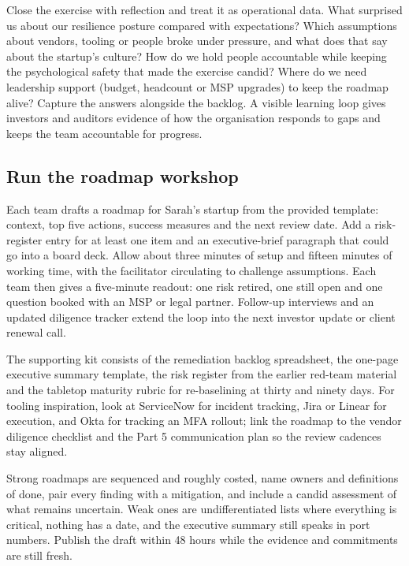 Close the exercise with reflection and treat it as operational data. What surprised us about our resilience posture compared with expectations? Which assumptions about vendors, tooling or people broke under pressure, and what does that say about the startup's culture? How do we hold people accountable while keeping the psychological safety that made the exercise candid? Where do we need leadership support (budget, headcount or MSP upgrades) to keep the roadmap alive? Capture the answers alongside the backlog. A visible learning loop gives investors and auditors evidence of how the organisation responds to gaps and keeps the team accountable for progress.



\subsection{Run the roadmap workshop}


Each team drafts a roadmap for Sarah's startup from the provided template: context, top five actions, success measures and the next review date. Add a risk-register entry for at least one item and an executive-brief paragraph that could go into a board deck. Allow about three minutes of setup and fifteen minutes of working time, with the facilitator circulating to challenge assumptions. Each team then gives a five-minute readout: one risk retired, one still open and one question booked with an MSP or legal partner. Follow-up interviews and an updated diligence tracker extend the loop into the next investor update or client renewal call.


The supporting kit consists of the remediation backlog spreadsheet, the one-page executive summary template, the risk register from the earlier red-team material and the tabletop maturity rubric for re-baselining at thirty and ninety days. For tooling inspiration, look at ServiceNow for incident tracking, Jira or Linear for execution, and Okta for tracking an MFA rollout; link the roadmap to the vendor diligence checklist and the Part 5 communication plan so the review cadences stay aligned.


Strong roadmaps are sequenced and roughly costed, name owners and definitions of done, pair every finding with a mitigation, and include a candid assessment of what remains uncertain. Weak ones are undifferentiated lists where everything is critical, nothing has a date, and the executive summary still speaks in port numbers. Publish the draft within 48 hours while the evidence and commitments are still fresh.

